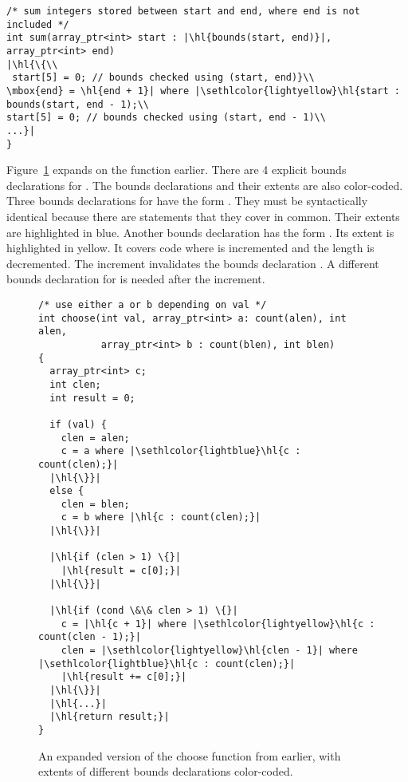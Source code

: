 \begin{lstlisting}[escapechar=\|]
/* sum integers stored between start and end, where end is not included */
int sum(array_ptr<int> start : |\hl{bounds(start, end)}|, array_ptr<int> end)
|\hl{\{\\
 start[5] = 0; // bounds checked using (start, end)}\\
\mbox{end} = \hl{end + 1}| where |\sethlcolor{lightyellow}\hl{start : bounds(start, end - 1);\\
start[5] = 0; // bounds checked using (start, end - 1)\\
...}|
}
\end{lstlisting}

Figure~\ref{fig:bounds-extent:choose} expands on the  function earlier.
There are 4 explicit bounds declarations for . The bounds declarations
and their extents are also color-coded. Three bounds declarations for 
have the form . They must be syntactically
identical because there are statements that they cover in common. Their
extents are highlighted in blue.  Another bounds declaration has
the form .   Its extent is highlighted
in yellow. It covers code where  is incremented and the
length is decremented.  The increment invalidates the bounds declaration
.  A different bounds declaration for 
is needed after the increment.

\begin{figure}
\begin{lstlisting}[escapechar=\|]
/* use either a or b depending on val */
int choose(int val, array_ptr<int> a: count(alen), int alen,
           array_ptr<int> b : count(blen), int blen)
{
  array_ptr<int> c;
  int clen;
  int result = 0;

  if (val) {
    clen = alen;
    c = a where |\sethlcolor{lightblue}\hl{c : count(clen);}|
  |\hl{\}}|
  else {
    clen = blen;
    c = b where |\hl{c : count(clen);}|
  |\hl{\}}|

  |\hl{if (clen > 1) \{}|
    |\hl{result = c[0];}|
  |\hl{\}}|

  |\hl{if (cond \&\& clen > 1) \{}|
    c = |\hl{c + 1}| where |\sethlcolor{lightyellow}\hl{c : count(clen - 1);}|
    clen = |\sethlcolor{lightyellow}\hl{clen - 1}| where |\sethlcolor{lightblue}\hl{c : count(clen);}|
    |\hl{result += c[0];}|
  |\hl{\}}|
  |\hl{...}|
  |\hl{return result;}|
}
\end{lstlisting}
\caption{An expanded version of the choose function from earlier, with extents of different bounds declarations color-coded.}
\label{fig:bounds-extent:choose}
\end{figure}


